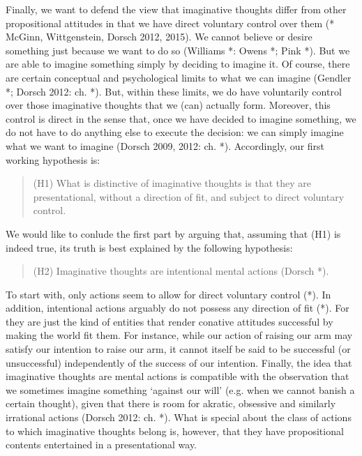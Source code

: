Finally, we want to defend the view that imaginative thoughts differ from other propositional attitudes in that we have direct voluntary control over them (* McGinn, Wittgenstein, Dorsch 2012, 2015). We cannot believe or desire something just because we want to do so (Williams *: Owens *; Pink *). But we are able to imagine something simply by deciding to imagine it. Of course, there are certain conceptual and psychological limits to what we can imagine (Gendler *;
Dorsch 2012: ch. *). But, within these limits, we do have voluntarily control over those imaginative thoughts that we (can) actually form. Moreover, this control is direct in the sense that, once we have decided to imagine something, we do not have to do anything else to execute the decision: we can simply imagine what we want to imagine (Dorsch 2009, 2012: ch. *). Accordingly, our first working hypothesis is:

\vspace{-.2cm}
\begin{quote}
(H1) What is distinctive of imaginative thoughts is that they are presentational, without a direction of fit, and subject to direct
voluntary control.
\end{quote}
\vspace{-.2cm}

\noindent We would like to conlude the first part by arguing that, assuming that (H1) is indeed true, its truth is best explained by the
following hypothesis:

\vspace{-.2cm}
\begin{quote}
(H2) Imaginative thoughts are intentional mental actions (Dorsch *).
\end{quote}
\vspace{-.2cm}

\noindent To start with, only actions seem to allow for direct voluntary control (*). In addition, intentional actions arguably do not possess any direction of fit (*). For they are just the kind of entities that render conative attitudes successful by making the world fit them. For instance, while our action of raising our arm may satisfy our intention to raise our arm, it cannot itself be said to be successful (or unsuccessful) independently of the success of our intention. Finally, the idea that imaginative thoughts are mental actions is compatible with the observation that we sometimes imagine something `against our will' (e.g. when we cannot banish a certain thought), given that there is room for akratic, obsessive and similarly irrational actions (Dorsch 2012: ch. *). What is special about the class of actions to which imaginative thoughts belong is, however, that they have propositional contents entertained in a presentational way.

